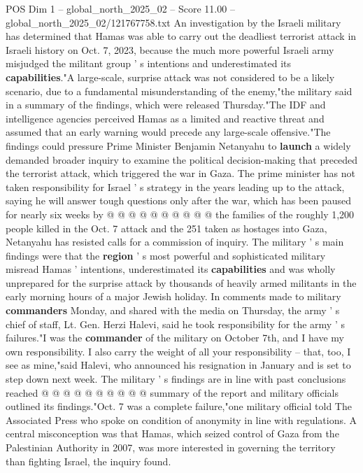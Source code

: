 \begin{textsample}{POS Dim 1 – global\_north\_2025\_02 – Score 11.00 – global\_north\_2025\_02/121767758.txt}  \label{ex:f1_pos_442}
An investigation by the Israeli military has determined that Hamas was able to carry out the deadliest terrorist attack in Israeli history on Oct. 7, 2023, because the much more powerful Israeli army misjudged the militant group ' s intentions and underestimated its \textbf{capabilities}."A large-scale, surprise attack was not considered to be a likely scenario, due to a fundamental misunderstanding of the enemy,"the military said in a summary of the findings, which were released Thursday."The IDF and intelligence agencies perceived Hamas as a limited and reactive threat and assumed that an early warning would precede any large-scale offensive."The findings could pressure Prime Minister Benjamin Netanyahu to \textbf{launch} a widely demanded broader inquiry to examine the political decision-making that preceded the terrorist attack, which triggered the war in Gaza.
The prime minister has not taken responsibility for Israel ' s strategy in the years leading up to the attack, saying he will answer tough questions only after the war, which has been paused for nearly six weeks by @ @ @ @ @ @ @ @ @ @ the families of the roughly 1,200 people killed in the Oct. 7 attack and the 251 taken as hostages into Gaza, Netanyahu has resisted calls for a commission of inquiry.
The military ' s main findings were that the \textbf{region} ' s most powerful and sophisticated military misread Hamas ' intentions, underestimated its \textbf{capabilities} and was wholly unprepared for the surprise attack by thousands of heavily armed militants in the early morning hours of a major Jewish holiday.
In comments made to military \textbf{commanders} Monday, and shared with the media on Thursday, the army ' s chief of staff, Lt.
Gen.
Herzi Halevi, said he took responsibility for the army ' s failures."I was the \textbf{commander} of the military on October 7th, and I have my own responsibility.
I also carry the weight of all your responsibility -- that, too, I see as mine,"said Halevi, who announced his resignation in January and is set to step down next week.
The military ' s findings are in line with past conclusions reached @ @ @ @ @ @ @ @ @ @ summary of the report and military officials outlined its findings."Oct. 7 was a complete failure,"one military official told The Associated Press who spoke on condition of anonymity in line with regulations.
A central misconception was that Hamas, which seized control of Gaza from the Palestinian Authority in 2007, was more interested in governing the territory than fighting Israel, the inquiry found.

\end{textsample}
